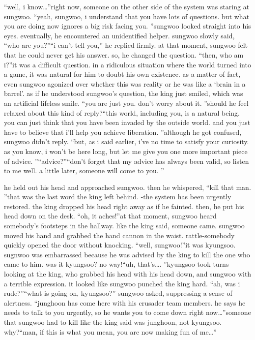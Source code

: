 “well, i know…”right now, someone on the other side of the system was staring at sungwoo.
“yeah, sungwoo, i understand that you have lots of questions.
 but what you are doing now ignores a big risk facing you.
”sungwoo looked straight into his eyes.
 eventually, he encountered an unidentified helper.
sungwoo slowly said, “who are you?”“i can’t tell you,” he replied firmly.
at that moment, sungwoo felt that he could never get his answer.
so, he changed the question.
“then, who am i?”it was a difficult question.
 in a ridiculous situation where the world turned into a game, it was natural for him to doubt his own existence.
as a matter of fact, even sungwoo agonized over whether this was reality or he was like a ‘brain in a barrel’.
as if he understood sungwoo’s question, the king just smiled, which was an artificial lifeless smile.
“you are just you.
 don’t worry about it.
”should he feel relaxed about this kind of reply?“this world, including you, is a natural being.
 you can just think that you have been invaded by the outside world.
 and you just have to believe that i’ll help you achieve liberation.
”although he got confused, sungwoo didn’t reply.
“but, as i said earlier, i’ve no time to satisfy your curiosity.
 as you know, i won’t be here long, but let me give you one more important piece of advice.
”“advice?”“don’t forget that my advice has always been valid, so listen to me well.
 a little later, someone will come to you.
”

he held out his head and approached sungwoo.
then he whispered, “kill that man.
”that was the last word the king left behind.
-the system has been urgently restored.
the king dropped his head right away as if he fainted.
 then, he put his head down on the desk.
“oh, it aches!”at that moment, sungwoo heard somebody’s footsteps in the hallway.
 like the king said, someone came.
 sungwoo moved his hand and grabbed the hand cannon in the waist.
rattle-somebody quickly opened the door without knocking.
“well, sungwoo!”it was kyungsoo.
sugnwoo was embarrassed because he was advised by the king to kill the one who came to him.
 was it kyungsoo? no way!“uh, that’s….
”kyungsoo took turns looking at the king, who grabbed his head with his head down, and sungwoo with a terrible expression.
 it looked like sungwoo punched the king hard.
“ah, was i rude?”“what is going on, kyungsoo?” sungwoo asked, suppressing a sense of alertness.
“junghoon has come here with his crusader team members.
 he says he needs to talk to you urgently, so he wants you to come down right now…”someone that sungwoo had to kill like the king said was junghoon, not kyungsoo.
why?“man, if this is what you mean, you are now making fun of me…”

 